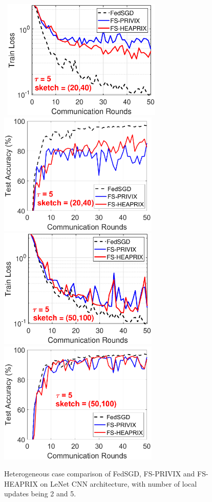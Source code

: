 \begin{figure}[h]
\begin{center}
		\mbox{			    \includegraphics[width=3in]{MNIST_figures/local5_sketch20_iid0_train_loss.eps}
		\includegraphics[width=3in]{MNIST_figures/local5_sketch20_iid0_test_acc.eps}
		}
		\mbox{			   
		\includegraphics[width=3in]{MNIST_figures/local5_sketch50_iid0_train_loss.eps}
		\includegraphics[width=3in]{MNIST_figures/local5_sketch50_iid0_test_acc.eps}
		}
	\end{center}
	\caption{Heterogeneous case comparison of FedSGD, FS-PRIVIX and FS-HEAPRIX on LeNet CNN architecture, with number of local updates being 2 and 5.}
    \label{fig:MNIST-tau2,tau5-iid0}
\end{figure}
